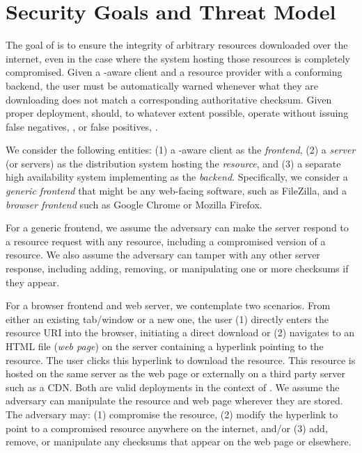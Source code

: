 \section{Security Goals and Threat Model} \label{sec:model}

The goal of \SYSTEM{} is to ensure the integrity of arbitrary resources
downloaded over the internet, even in the case where the system hosting those
resources is completely compromised. Given a \SYSTEM{}-aware client and a
resource provider with a conforming backend, the user must be automatically
warned whenever what they are downloading does not match a corresponding
authoritative checksum. Given proper deployment, \SYSTEM{} should, to whatever
extent possible, operate without issuing false negatives, , or false positives, .

We consider the following entities: (1) a \SYSTEM{}-aware client as the
\emph{frontend}, (2) a \emph{server} (or servers) as the distribution system
hosting the \emph{resource}, and (3) a separate high availability system
implementing \SYSTEM{} as the \emph{backend}. Specifically, we consider a
\emph{generic frontend} that might be any web-facing software, such as
FileZilla, and a \emph{browser frontend} such as Google Chrome or Mozilla
Firefox.

For a generic frontend, we assume the adversary can make the server respond to a
resource request with any resource, including a compromised version of a
resource. We also assume the adversary can tamper with any other server
response, including adding, removing, or manipulating one or more checksums if
they appear.

For a browser frontend and web server, we contemplate two scenarios. From either
an existing tab/window or a new one, the user (1) directly enters the resource
URI into the browser, initiating a direct download or (2) navigates to an HTML
file (\emph{web page}) on the server containing a hyperlink pointing to the
resource. The user clicks this hyperlink to download the resource. This resource
is hosted on the same server as the web page or externally on a third party
server such as a CDN. Both are valid deployments in the context of \SYSTEM{}. We
assume the adversary can manipulate the resource and web page wherever they are
stored. The adversary may: (1) compromise the resource, (2) modify the hyperlink
to point to a compromised resource anywhere on the internet, and/or (3) add,
remove, or manipulate any checksums that appear on the web page or elsewhere.

